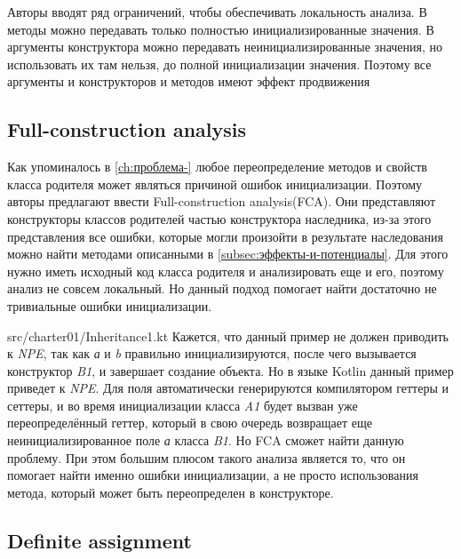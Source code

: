 Авторы вводят ряд ограничений, чтобы обеспечивать локальность анализа.
В методы можно передавать только полностью инициализированные значения.
В аргументы конструктора можно передавать неинициализированные значения, но использовать их там нельзя,
до полной инициализации значения.
Поэтому все аргументы и конструкторов и методов имеют эффект продвижения

\subsection{Full-construction analysis}\label{subsec:full-construction-analysis}

Как упоминалось в \autoref{ch:проблема-} любое переопределение методов и свойств класса родителя может являться причиной ошибок инициализации.
Поэтому авторы предлагают ввести Full-construction analysis(FCA).
Они представляют конструкторы классов родителей частью конструктора наследника, из-за этого представления все ошибки,
которые могли произойти в результате наследования можно найти методами описанными в \autoref{subsec:эффекты-и-потенциалы}.
Для этого нужно иметь исходный код класса родителя и анализировать еще и его, поэтому анализ не совсем локальный.
Но данный подход помогает найти достаточно не тривиальные ошибки инициализации.

{src/charter01/Inheritance1.kt}
Кажется, что данный пример не должен приводить к \emph{NPE}, так как \emph{а} и \emph{b} правильно инициализируются,
после чего вызывается конструктор \emph{B1}, и завершает создание объекта.
Но в языке Kotlin данный пример приведет к \emph{NPE}.
Для поля автоматически генерируются компилятором геттеры и сеттеры,
и во время инициализации класса \emph{A1} будет вызван уже переопределённый геттер,
который в свою очередь возвращает еще неинициализированное поле \emph{а} класса \emph{B1}.
Но FCA сможет найти данную проблему.
При этом большим плюсом такого анализа является то, что он помогает найти именно ошибки инициализации,
а не просто использования метода, который может быть переопределен в конструкторе.

\subsection{Definite assignment}\label{subsec:definite-assignment}




